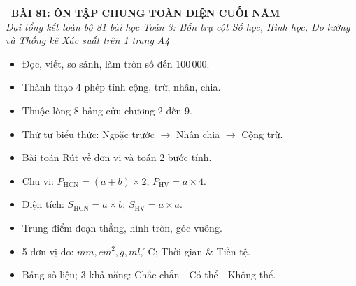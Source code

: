 \documentclass[11pt,a4paper]{article}
\begin{document}
\begin{tcolorbox}[
  enhanced,
  colback=white,
  colframe=primary,
  arc=3mm,
  boxrule=1.2pt,
  left=4mm, right=4mm, top=2.5mm, bottom=2.5mm,
  drop shadow=black!10!white
]
  \centering
  {\Large\bfseries\color{primary}\faBookmark\ BÀI 81: ÔN TẬP CHUNG TOÀN DIỆN CUỐI NĂM}\\[1.5mm]
  {\small\itshape\color{black!75}Đại tổng kết toàn bộ 81 bài học Toán 3: Bốn trụ cột Số học, Hình học, Đo lường và Thống kê Xác suất trên 1 trang A4}
\end{tcolorbox}

\vspace{-2mm}


\noindent
\begin{minipage}[t]{0.49\textwidth}\vspace{0pt}
\begin{tcolorbox}[
  enhanced,
  colback=blue!4!white,
  colframe=blue!75!black,
  arc=2mm, boxrule=0.8pt,
  left=2mm, right=2mm, top=1.8mm, bottom=1.8mm,
  title={\footnotesize\bfseries\color{white}\faCalculator\ 1. Trụ cột Số học \& Phép tính}
]
{\footnotesize
\begin{itemize}\setlength{\itemsep}{1.5pt}\setlength{\leftskip}{-2.5mm}
  \item Đọc, viết, so sánh, làm tròn số đến $100\,000$.
  \item Thành thạo $4$ phép tính cộng, trừ, nhân, chia.
  \item Thuộc lòng 8 bảng cửu chương 2 đến 9.
  \item Thứ tự biểu thức: Ngoặc trước $\to$ Nhân chia $\to$ Cộng trừ.
  \item Bài toán Rút về đơn vị và toán 2 bước tính.
\end{itemize}
}
\end{tcolorbox}
\end{minipage}
\hfill
\begin{minipage}[t]{0.49\textwidth}\vspace{0pt}
\begin{tcolorbox}[
  enhanced,
  colback=teal!4!white,
  colframe=teal!75!black,
  arc=2mm, boxrule=0.8pt,
  left=2mm, right=2mm, top=1.8mm, bottom=1.8mm,
  title={\footnotesize\bfseries\color{white}\faCube\ 2. Trụ cột Hình học, Đo lường \& Thống kê}
]
{\footnotesize
\begin{itemize}\setlength{\itemsep}{1.5pt}\setlength{\leftskip}{-2.5mm}
  \item Chu vi: $P_{\text{HCN}} = (a+b)\times 2$; $P_{\text{HV}} = a \times 4$.
  \item Diện tích: $S_{\text{HCN}} = a \times b$; $S_{\text{HV}} = a \times a$.
  \item Trung điểm đoạn thẳng, hình tròn, góc vuông.
  \item 5 đơn vị đo: $mm, cm^2, g, ml, ^\circ\text{C}$; Thời gian \& Tiền tệ.
  \item Bảng số liệu; 3 khả năng: Chắc chắn - Có thể - Không thể.
\end{itemize}
}
\end{tcolorbox}
\end{minipage}
\end{document}

